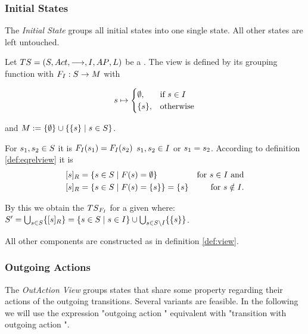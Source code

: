 \documentclass[preview]{standalone}
\begin{document}
\subsubsection{Initial States}
The \emph{Initial State \viewNC}  groups all initial states into one single state. All other states are left untouched.

\begin{definition}
	Let ${TS} = {({S}, {Act}, {\longrightarrow}, {I}, {AP}, {L})}$ be a \chosengraphtypeN. The view \viewinitstates is defined by its grouping function \gfctinitstates \grpfctN with ${{{{F}}_{I}}} : {S} \to {\ensuremath{{M}}}$ with 
	
	\[
	{s} \mapsto
	\begin{cases}
		\emptyset,				& \text{if } {s} \in {I} \\
		\{{s}\},          	& \text{otherwise}
	\end{cases}
	\]
	
	and ${{M}} := \{\emptyset\} \cup \{\{{s}\} \mid {s} \in {S}\}$.
\end{definition}

For ${s}_1,{s}_2 \in {S}$ it is ${{{{F}}_{I}}}({s}_1) = {{{{F}}_{I}}}({s}_2)$ \iffN ${s}_1, {s}_2 \in {I}$ or ${s}_1 = {s}_2$. According to definition \ref{def:eqrelview} it is 
\begin{align*}
	{\ensuremath{{[{s}]_{{R}}}}} &= \{{s} \in {S} \mid {F}({s}) = \emptyset\} &\text{for } {s} \in {I} \text{ and} \\
	{{[{s}]_{{R}}}} &= \{{s} \in {S} \mid {F}({s}) = \{{s}\} \} = \{{s}\} &\text{for } {s} \notin {I}.
\end{align*}


By this we obtain the \viewN ${{{{TS}}_{{{{F}}_{I}}}}}$ for a given \chosengraphtypeN \ts where: ${S}' = \bigcup_{{s} \in {S}} \{{{[{s}]_{{R}}}}\} = \{{s} \in {S} \mid {s} \in {I}\}\cup \bigcup_{{s} \in {S} \setminus {I}}\{\{{s}\}\}$.

All other components are constructed as in definition \ref{def:view}.

\subsubsection{Outgoing Actions}
The \emph{OutAction View} groups states that share some property regarding their actions  of the outgoing transitions. Several variants are feasible. In the following we will use the expression "outgoing action \action" equivalent with "transition with outgoing action \action".
\end{document}
